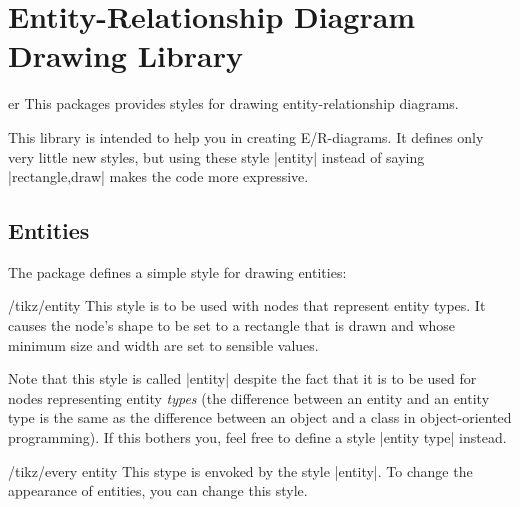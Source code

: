 %
%
%


\section{Entity-Relationship Diagram Drawing Library}

\begin{tikzlibrary}{er}
  This packages provides styles for drawing entity-relationship
  diagrams. 
\end{tikzlibrary}

This library is intended to help you in creating E/R-diagrams. It defines
only very little new styles, but using these style |entity| instead of
saying |rectangle,draw| makes the code more expressive.


\subsection{Entities}

The package defines a simple style for drawing entities:

\begin{stylekey}{/tikz/entity}
  This style is to be used with nodes that represent entity types. It
  causes the node's shape to be set to a rectangle that is drawn and
  whose minimum size and width are set to sensible values.

  Note that this style is called |entity| despite the fact that it is
  to be used for nodes representing entity \emph{types} (the
  difference between an entity and an entity type is the same as the
  difference between an object and a class in object-oriented
  programming). If this bothers you, feel free to define a style
  |entity type| instead.
\begin{codeexample}[]
\end{codeexample}
\end{stylekey}

\begin{stylekey}{/tikz/every entity}
  This stype is envoked by the style |entity|. To change the
  appearance of entities, you can change this style.
\begin{codeexample}[]
\end{codeexample}
\end{stylekey}



